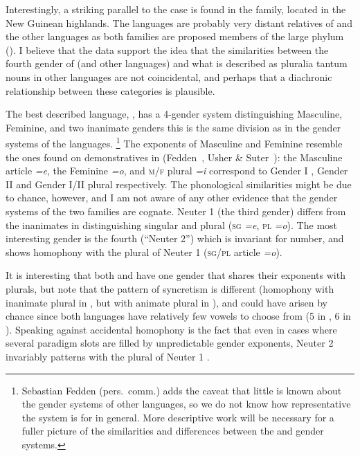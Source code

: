 \documentclass[output=collectionpaper]{langsci/langscibook}
\begin{document}
Interestingly, a striking parallel to the  case is found in the  family, located in the New Guinean highlands. The  languages are probably very distant relatives of  and the other  languages as both families are proposed members of the large  phylum (\citealt{Fedden2011, Usher2015}). I believe that the  data support the idea that the similarities between the fourth gender of  (and other  languages) and what is described as pluralia tantum nouns in other languages are not coincidental, and perhaps that a diachronic relationship between these categories is plausible.

\largerpage[-1]
The best described  language, , has a 4-gender system distinguishing Masculine, Feminine, and two inanimate genders \textendash{} this is the same division as in the gender systems of the  languages.%
\footnote{Sebastian Fedden (pers.\ comm.\@) adds the caveat that little is known about the gender systems of other  languages, so we do not know how representative the  system is for  in general. More descriptive work will be necessary for a fuller picture of the similarities and differences between the  and  gender systems.
} %
The exponents of Masculine and Feminine resemble the ones found on demonstratives in  (Fedden~\citeyear[170]{Fedden2011}, Usher \& Suter~\citeyear[118]{Usher2015}): the  Masculine article \emph{=e}, the Feminine \emph{=o}, and \textsc{m}/\textsc{f} plural \emph{=i} correspond to  Gender I , Gender II  and Gender I/II plural  respectively. The phonological similarities might be due to chance, however, and I am not aware of any other evidence that the gender systems of the two families are cognate. Neuter 1 (the third gender) differs from the  inanimates in distinguishing singular and plural (\textsc{sg} \emph{=e}, \textsc{pl} \emph{=o}). The most interesting gender is the fourth (``Neuter 2'') which is invariant for number, and shows homophony with the plural of Neuter 1 (\textsc{sg}/\textsc{pl} article \emph{=o}).

It is interesting that both  and  have one gender that shares their exponents with plurals, but note that the pattern of syncretism is different (homophony with inanimate plural in , but with animate plural in ), and could have arisen by chance since both languages have relatively few vowels to choose from (5 in , 6 in ). Speaking against accidental homophony is the fact that even in cases where several paradigm slots are filled by unpredictable gender exponents, Neuter 2 invariably patterns with the plural of Neuter 1 \citep[178--179]{Fedden2011}.
\end{document}
